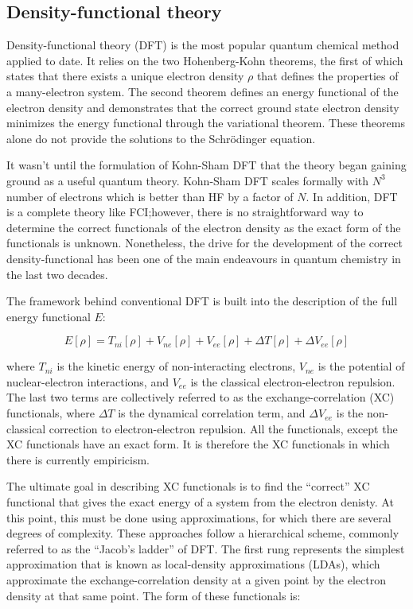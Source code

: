 \begin{doublespace}
\subsection{Density-functional theory}

Density-functional theory (DFT) is the most popular quantum chemical method
applied to date. It relies on the two Hohenberg-Kohn theorems, the first of
which states that there exists a unique electron density $\rho$ that defines
the properties of a many-electron system. The second theorem defines an energy
functional of the electron density and demonstrates that the correct ground
state electron density minimizes the energy functional through the variational
theorem.\cite{Hohenberg1964,Koch2000} These theorems alone do not provide the
solutions to the Schr{\"o}dinger equation.

It wasn't until the formulation of Kohn-Sham DFT\cite{Kohn1965} that the theory
began gaining ground as a useful quantum theory. Kohn-Sham DFT scales formally
with $N^3$ number of electrons\cite{Cramer2004} which is better than HF by a
factor of $N$. In addition, DFT is a complete theory like FCI;\@ however, there
is no straightforward way to determine the correct functionals of the electron
density as the exact form of the functionals is unknown. Nonetheless, the drive
for the development of the correct density-functional has been one of the main
endeavours in quantum chemistry in the last two decades.

The framework behind conventional DFT is built into the description of the full
energy functional $E$:

\begin{equation}
  E[\rho] = T_{ni}[\rho] + V_{ne}[\rho] + V_{ee}[\rho] + \Delta T[\rho] + \Delta V_{ee}[\rho]
\label{eq:DFT}
\end{equation}

\noindent where $T_{ni}$ is the kinetic energy of non-interacting electrons,
$V_{ne}$ is the potential of nuclear-electron interactions, and $V_{ee}$ is the
classical electron-electron repulsion. The last two terms are collectively
referred to as the exchange-correlation (XC) functionals, where $\Delta T$ is
the dynamical correlation term, and $\Delta V_{ee}$ is the non-classical
correction to electron-electron repulsion. All the functionals, except the XC
functionals have an exact form. It is therefore the XC functionals in which
there is currently empiricism.

The ultimate goal in describing XC functionals is to find the ``correct'' XC
functional that gives the exact energy of a system from the electron denisty.
At this point, this must be done using approximations, for which there are
several degrees of complexity. These approaches follow a hierarchical scheme,
commonly referred to as the ``Jacob's ladder'' of DFT.\cite{Perdew2005} The
first rung represents the simplest approximation that is known as
local-density approximations (LDAs), which approximate the exchange-correlation
density at a given point by the electron density at that same point. The form
of these functionals is:


\end{doublespace}
